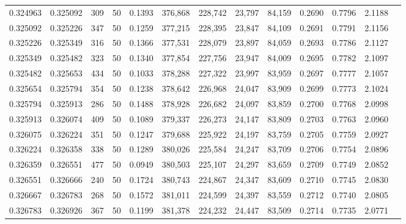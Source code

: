 \begin{tabular}{rrrrrrrrrrrrr}
0.324963 & 0.325092 &   309 &  50 &                                     0.1393 & 376,868 & 228,742 &  23,797 &  84,159 & 0.2690 & 0.7796 & 2.1188 \\
0.325092 & 0.325226 &   347 &  50 &                                     0.1259 & 377,215 & 228,395 &  23,847 &  84,109 & 0.2691 & 0.7791 & 2.1156 \\
0.325226 & 0.325349 &   316 &  50 &                                     0.1366 & 377,531 & 228,079 &  23,897 &  84,059 & 0.2693 & 0.7786 & 2.1127 \\
0.325349 & 0.325482 &   323 &  50 &                                     0.1340 & 377,854 & 227,756 &  23,947 &  84,009 & 0.2695 & 0.7782 & 2.1097 \\
0.325482 & 0.325653 &   434 &  50 &                                     0.1033 & 378,288 & 227,322 &  23,997 &  83,959 & 0.2697 & 0.7777 & 2.1057 \\
0.325654 & 0.325794 &   354 &  50 &                                     0.1238 & 378,642 & 226,968 &  24,047 &  83,909 & 0.2699 & 0.7773 & 2.1024 \\
0.325794 & 0.325913 &   286 &  50 &                                     0.1488 & 378,928 & 226,682 &  24,097 &  83,859 & 0.2700 & 0.7768 & 2.0998 \\
0.325913 & 0.326074 &   409 &  50 &                                     0.1089 & 379,337 & 226,273 &  24,147 &  83,809 & 0.2703 & 0.7763 & 2.0960 \\
0.326075 & 0.326224 &   351 &  50 &                                     0.1247 & 379,688 & 225,922 &  24,197 &  83,759 & 0.2705 & 0.7759 & 2.0927 \\
0.326224 & 0.326358 &   338 &  50 &                                     0.1289 & 380,026 & 225,584 &  24,247 &  83,709 & 0.2706 & 0.7754 & 2.0896 \\
0.326359 & 0.326551 &   477 &  50 &                                     0.0949 & 380,503 & 225,107 &  24,297 &  83,659 & 0.2709 & 0.7749 & 2.0852 \\
0.326551 & 0.326666 &   240 &  50 &                                     0.1724 & 380,743 & 224,867 &  24,347 &  83,609 & 0.2710 & 0.7745 & 2.0830 \\
0.326667 & 0.326783 &   268 &  50 &                                     0.1572 & 381,011 & 224,599 &  24,397 &  83,559 & 0.2712 & 0.7740 & 2.0805 \\
0.326783 & 0.326926 &   367 &  50 &                                     0.1199 & 381,378 & 224,232 &  24,447 &  83,509 & 0.2714 & 0.7735 & 2.0771 \\

\end{tabular}
